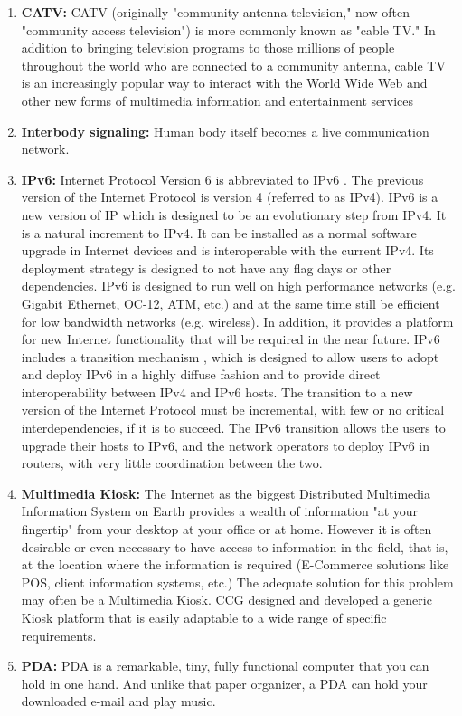 \documentclass[12pt]{report}
\begin{document}
\begin{enumerate}
\item {\bf CATV:} CATV (originally "community antenna television," now often "community access television") is more commonly known as "cable TV." In addition to bringing television programs to those millions of people throughout the world who are connected to a community antenna, cable TV is an increasingly popular way to interact with the World Wide Web and other new forms of multimedia information and entertainment services
\item {\bf Interbody signaling:} Human body itself becomes a live communication network.
\item {\bf IPv6:} Internet Protocol Version 6 is abbreviated to IPv6 . The previous version of the Internet Protocol is version 4 (referred to as IPv4). IPv6 is a new version of IP which is designed to be an evolutionary step from IPv4. It is a natural increment to IPv4. It can be installed as a normal software upgrade in Internet devices and is interoperable with the current IPv4. Its deployment strategy is designed to not have any flag days or other dependencies. IPv6 is designed to run well on high performance networks (e.g. Gigabit Ethernet, OC-12, ATM, etc.) and at the same time still be efficient for low bandwidth networks (e.g. wireless). In addition, it provides a platform for new Internet functionality that will be required in the near future. IPv6 includes a transition mechanism , which is designed to allow users to adopt and deploy IPv6 in a highly diffuse fashion and to provide direct interoperability between IPv4 and IPv6 hosts. The transition to a new version of the Internet Protocol must be incremental, with few or no critical interdependencies, if it is to succeed. The IPv6 transition allows the users to upgrade their hosts to IPv6, and the network operators to deploy IPv6 in routers, with very little coordination between the two.
\item {\bf Multimedia Kiosk:} The Internet as the biggest Distributed Multimedia Information System on Earth provides a wealth of information "at your fingertip" from your desktop at your office or at home. However it is often desirable or even necessary to have access to information in the field, that is, at the location where the information is required (E-Commerce solutions like POS, client information systems, etc.) The adequate solution for this problem may often be a Multimedia Kiosk. CCG designed and developed a generic Kiosk platform that is easily adaptable to a wide range of specific requirements.
\item {\bf PDA:} PDA is a remarkable, tiny, fully functional computer that you can hold in one hand. And unlike that paper organizer, a PDA can hold your downloaded e-mail and play music.

\end{enumerate}
\end{document}
